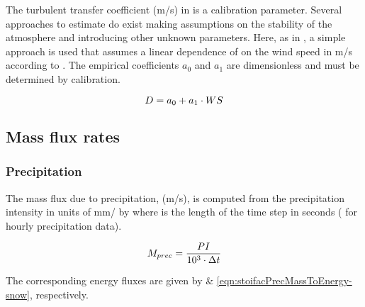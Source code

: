 The turbulent transfer coefficient \turbTransCoeff{} (m/s) in  is a calibration parameter. Several approaches to estimate \turbTransCoeff{} do exist \citep[e.~g.][]{Dyck1995, Tarboton1996} making assumptions on the stability of the atmosphere and introducing other unknown parameters. Here, as in \citet{Knauf1980}, a simple approach is used that assumes a linear dependence of \turbTransCoeff{} on the wind speed \windspeed{} in m/s according to . The empirical coefficients $a_0$ and $a_1$ are dimensionless and must be determined by calibration.

\begin{equation} \label{eqn:turbTransCoeff-wind}
  D = a_0 + a_1 \cdot WS
\end{equation}


\subsection{Mass flux rates} \label{sec:snow-enBal_fluxrates-mass}


\subsubsection{Precipitation}
The mass flux due to precipitation, \massfluxPrec{} (m/s), is computed from the precipitation intensity in units of mm/\deltat{} by  where \deltat{} is the length of the time step in seconds (\eg{}  for hourly precipitation data).

\begin{equation} \label{eqn:snow-enBal_massfluxPrec}
  M_{prec} = \frac{PI}{10^3 \cdot \Delta t}
\end{equation}

The corresponding energy fluxes are given by  \& \ref{eqn:stoifacPrecMassToEnergy-snow}, respectively.


